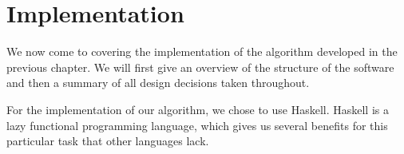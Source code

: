 \documentclass[10pt, a4paper]{report}
\begin{document}





\newpage 

\chapter{Implementation}

We now come to covering the implementation of the algorithm developed in the
previous chapter. We will first give an overview of the structure of the
software and then a summary of all design decisions taken throughout. 

For the implementation of our algorithm, we chose to use Haskell. Haskell is a
lazy functional programming language, which gives us several benefits for this
particular task that other languages lack. 
\end{document}

